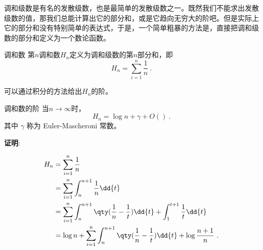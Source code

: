

调和级数是有名的发散级数，也是最简单的发散级数之一。既然我们不能求出发散级数的值，那我们总能计算出它的部分和，或是它趋向无穷大的阶吧。但是实际上它的部分和没有特别简单的表达式，于是，一个简单粗暴的方法是，直接把调和级数的部分和定义为一个数论函数。

\begin{definition}{调和数}
第$n$调和数$H_n$定义为调和级数的第$n$部分和，即
\begin{equation}
H_n = \sum_{i=1}^n\frac{1}{n}~.
\end{equation}
\end{definition}

可以通过积分的方法给出$H_n$的阶。

\begin{theorem}{调和数的阶}
当$n\to\infty$时，
\begin{equation}
H_n = \log n + \gamma + O() ~.
\end{equation}
其中 $\gamma$ 称为 Euler-Mascheroni 常数。
\end{theorem}

\textbf{证明}:

\begin{equation}
\begin{aligned}
H_n & = \sum_{i=1}^n\frac{1}{n}\\
& = \sum_{i=1}^n\int_n^{n+1}\frac{1}{n}\dd{t}\\
& = \sum_{i=1}^n\int_n^{n+1}\qty(\frac{1}{n}-\frac{1}{t})\dd{t}+\int_1^{t+1}\frac{1}{t}\dd{t}\\
& = \log n+\sum_{i=1}^n\int_n^{n+1}\qty(\frac{1}{n}-\frac{1}{t})\dd{t}+\log\frac{n+1}{n}~.
\end{aligned}
\end{equation}

